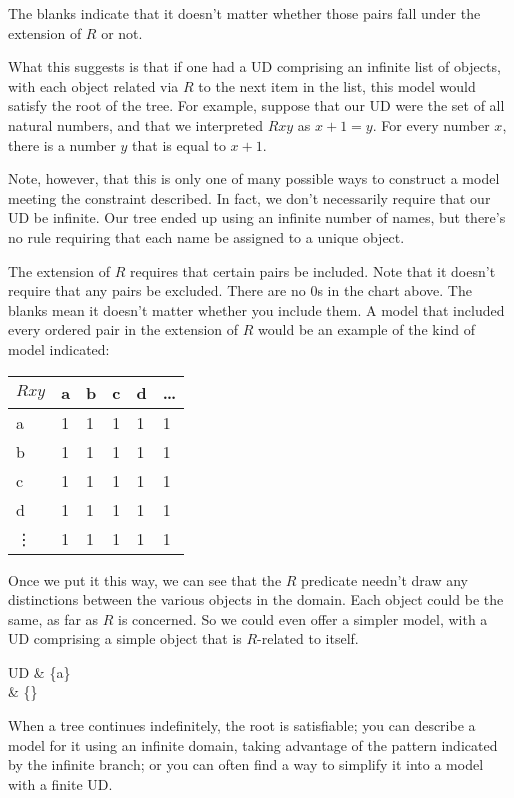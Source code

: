 The blanks indicate that it doesn't matter whether those pairs fall under the extension of $R$ or not.

What this suggests is that if one had a UD comprising an infinite list of objects, with each object related via $R$ to the next item in the list, this model would satisfy the root of the tree. For example, suppose that our UD were the set of all natural numbers, and that we interpreted $Rxy$ as $x+1=y$. For every number $x$, there is a number $y$ that is equal to $x+1$.

Note, however, that this is only one of many possible ways to construct a model meeting the constraint described. In fact, we don't necessarily require that our UD be infinite. Our tree ended up using an infinite number of names, but there's no rule requiring that each name be assigned to a unique object.

The extension of $R$ requires that certain pairs be included. Note that it doesn't require that any pairs be excluded. There are no 0s in the chart above. The blanks mean it doesn't matter whether you include them. A model that included every ordered pair in the extension of $R$ would be an example of the kind of model indicated:

\begin{table}[h!]
\centering
\begin{tabular}{l|lllll}
$Rxy$   & a & b & c & d & \ldots \\ \hline
a   & 1 & 1 & 1 & 1 & 1  \\
b   & 1 & 1 & 1 & 1 & 1  \\
c   & 1 & 1 & 1 & 1 & 1   \\
d   & 1 & 1 & 1 & 1 & 1   \\
\vdots & 1 & 1 & 1 & 1 & 1
\end{tabular}
\end{table}

Once we put it this way, we can see that the $R$ predicate needn't draw any distinctions between the various objects in the domain. Each object could be the same, as far as $R$ is concerned. So we could even offer a simpler model, with a UD comprising a simple object that is $R$-related to itself.

\begin{partialmodel}
	UD & \{a\}\\
	 & \{\}
\end{partialmodel}


When a tree continues indefinitely, the root is satisfiable; you can describe a model for it using an infinite domain, taking advantage of the pattern indicated by the infinite branch; or you can often find a way to simplify it into a model with a finite UD.

